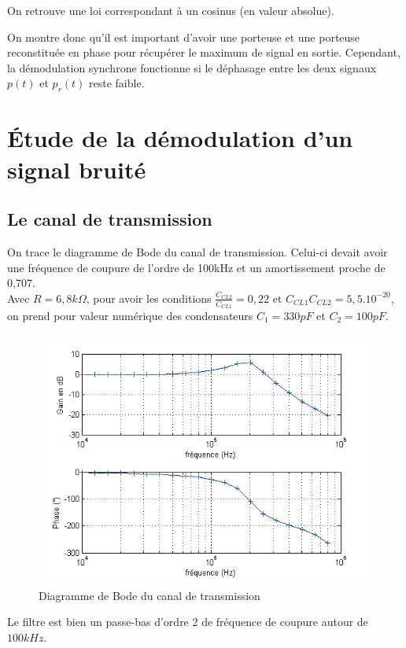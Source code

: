 \documentclass[../../Cours_M1.tex]{subfiles}
\begin{document}
On retrouve une loi correspondant à un cosinus (en valeur absolue). 

On montre donc qu'il est important d'avoir une porteuse et une porteuse reconstituée en phase pour récupérer le maximum de signal en sortie. Cependant, la démodulation synchrone fonctionne si le déphasage entre les deux signaux $p(t)$ et $p_r(t)$ reste faible.

\newpage
\section{Étude de la démodulation d'un signal bruité}

\subsection{Le canal de transmission}

On trace le diagramme de Bode du canal de transmission. Celui-ci devait avoir une fréquence de coupure de l'ordre de 100kHz et un amortissement proche de 0,707. \\
Avec $R=6,8k\Omega$, pour avoir les conditions $\frac{C_{CL2}}{C_{CL1}}=0,22$ et $C_{CL1}C_{CL2}=5,5.10^{-20}$, on prend pour valeur numérique des condensateurs $C_1 = 330 pF$ et $C_2 = 100 pF$.

\begin{figure}[h!]
\centering
\includegraphics[scale=0.7]{BodeCacanal.png}
\caption{Diagramme de Bode du canal de transmission}
\end{figure}

Le filtre est bien un passe-bas d'ordre 2 de fréquence de coupure autour de $100kHz$.
\end{document}
